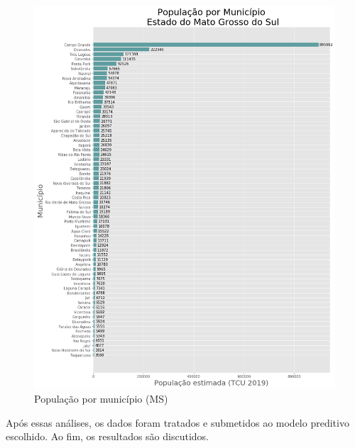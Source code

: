 \documentclass[12pt]{article}
\begin{document}
\begin{figure}[!htb]
  \centering
  \includegraphics[width=1\textwidth]{figs/pop_por_municipio.png}
  \caption{População por município (MS)}
  \label{fig:popuMuniMS}
  \end{figure}


Após essas análises, os dados foram tratados e submetidos ao modelo preditivo escolhido. Ao fim, os resultados são discutidos.
\end{document}
